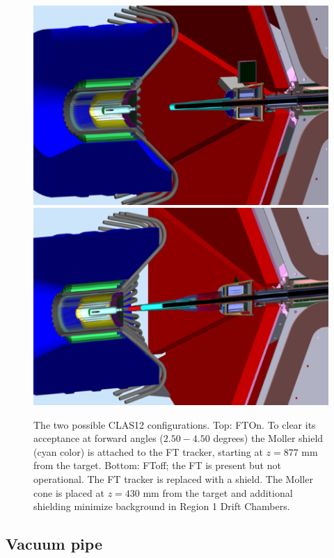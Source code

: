 \begin{figure}
	\centering
	\includegraphics[width=0.98\columnwidth,keepaspectratio]{img/ftOnGeometry.png}
	\includegraphics[width=0.98\columnwidth,keepaspectratio]{img/ftOffGeometry.png}
   \caption{The two possible CLAS12 configurations. Top: FTOn. To clear its acceptance at forward angles ($2.50-4.50$ degrees)
            the Moller shield (cyan color) is attached to the FT tracker, starting at $z=877$ mm from the target.
            Bottom: FToff; the FT is present but not operational. The FT tracker is replaced with a shield.
            The Moller cone is placed at $z=430$ mm from the target and additional shielding minimize background in Region 1 Drift Chambers.}
	\label{fig:beamlineGeometry}
\end{figure}

\subsection{Vacuum pipe}

